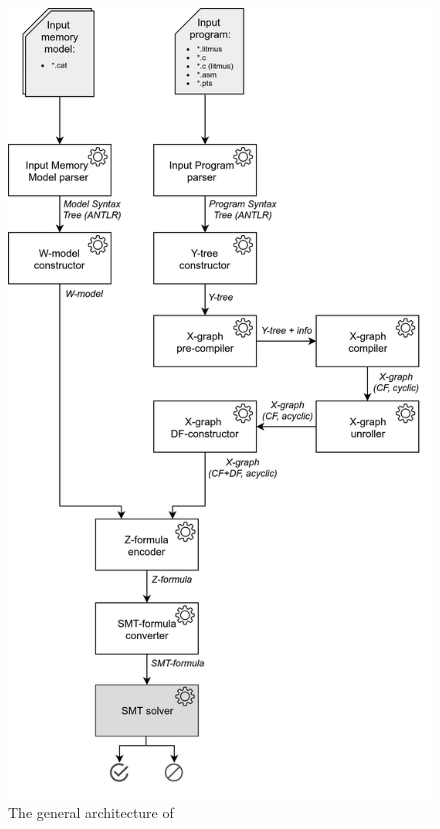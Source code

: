 \begin{figure}%
  \centering
  \includegraphics[height=.98\textheight,keepaspectratio]{img/my/draw.io/general_arch-no_numbering.png}
  \caption{The general architecture of \porthos[2]}
  \label{fig:arch}
\end{figure}

